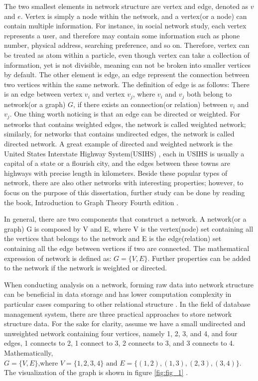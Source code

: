 \documentclass[12pt]{article}
\begin{document}
The two smallest elements in network structure are vertex and edge, denoted as $v$ and $e$. Vertex is simply a node within the network, and a vertex(or a node) can contain multiple information. For instance, in social network study, each vertex represents a user, and therefore may contain some information such as phone number, physical address, searching preference, and so on.  Therefore, vertex can be treated as atom within a particle, even though vertex can take a collection of information, yet is not divisible, meaning can not be broken into smaller vertices by default. The other element is edge, an edge represent the connection between two vertices within the same network. The definition of edge is as follows:  There is an edge between vertex $v_i$ and vertex $v_j$, where $v_i$ and $v_j$ both belong to network(or a graph) $G$, if there exists an connection(or relation) between $v_i$ and $v_j$. One thing worth noticing is that an edge can be directed or weighted. For networks that contains weighted edges, the network is called weighted network; similarly, for networks that contains undirected edges, the network is called directed network. A great example of directed and weighted network is the United States Interstate Highway System(USIHS) \cite{14}, each in USIHS is usually a capital of a state or a flourish city, and the edges between these towns are highways with precise length in kilometers. Beside these popular types of network, there are also other networks with interesting properties; however, to focus on the purpose of this dissertation, further study can be done by reading the book, Introduction to Graph Theory Fourth edition \cite{15}.

\bigbreak

In general, there are two components that construct a network. A network(or a graph) G is composed by V and E, where V is the vertex(node) set containing all the vertices that belongs to the network and E is the edge(relation) set containing all the edge between vertices if two are connected. The mathematical expression of network is defined as: $G = \{V, E\}$. Further properties can be added to the network if the network is weighted or directed. 

\bigbreak

When conducting analysis on a network, forming raw data into network structure can be beneficial in data storage and has lower computation complexity in particular cases comparing to other relational structure \cite{6}. In the field of database management system, there are three practical approaches to store network structure data. For the sake for clarity, assume we have a small undirected and unweighted network containing four vertices, namely 1, 2, 3, and 4, and four edges, 1 connects to 2, 1 connect to 3, 2 connects to 3, and 3 connects to 4. Mathematically, $G = \{V, E\} \text{,where }V=\{1,2,3,4\}\text{ and }E=\{(1,2),(1,3),(2,3),(3,4)\}$. The visualization of the graph is shown in figure \ref{fig:fig_1} .
\end{document}
